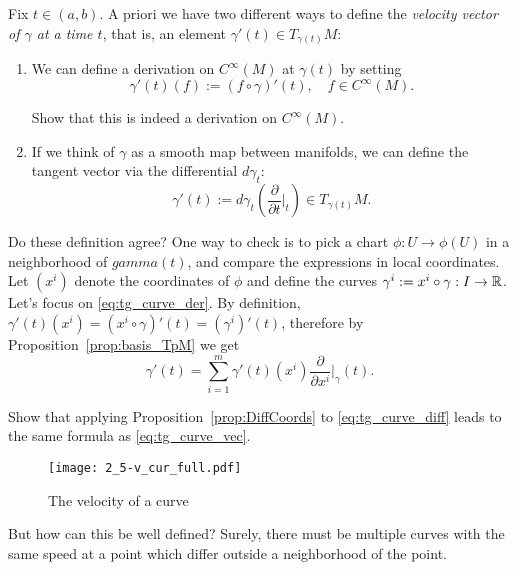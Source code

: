 Fix $t\in(a,b)$. 
A priori we have two different ways to define the \emph{velocity vector of $\gamma$ at a time $t$}, that is, an element $\gamma'(t) \in T_{\gamma(t)}M$:
\begin{enumerate}
    \item We can define a derivation on $C^\infty(M)$ at $\gamma(t)$ by setting
    \begin{equation}\label{eq:tg_curve_der}
        \gamma'(t) (f) := (f\circ\gamma)'(t), \quad f\in C^\infty(M).
    \end{equation}
    \begin{exe}
        Show that this is indeed a derivation on $C^\infty(M)$.
    \end{exe}
    \item If we think of $\gamma$ as a smooth map between manifolds, we can define the tangent vector via the differential $d\gamma_t$:
    \begin{equation}\label{eq:tg_curve_diff}
        \gamma'(t):= d\gamma_t\left(\frac{\partial}{\partial t}\Big|_t\right) \in T_{\gamma(t)}M.
    \end{equation}
\end{enumerate}

Do these definition agree?
One way to check is to pick a chart $\phi: U \to \phi(U)$ in a neighborhood of $gamma(t)$, and compare the expressions in local coordinates. Let $(x^i)$ denote the coordinates of $\phi$ and define the curves $\gamma^i := x^i \circ \gamma : I\to\mathbb{R}$.
Let's focus on \eqref{eq:tg_curve_der}. By definition, $\gamma'(t)(x^i) = (x^i\circ\gamma)'(t) = (\gamma^i)'(t)$, therefore by Proposition~\ref{prop:basis_TpM} we get
\begin{equation}\label{eq:tg_curve_vec}
    \gamma'(t) = \sum_{i=1}^m \gamma'(t)(x^i) \frac{\partial}{\partial x^i}\Big|_\gamma(t).
\end{equation}
\begin{exe}
    Show that applying Proposition~\ref{prop:DiffCoords} to \eqref{eq:tg_curve_diff} leads to the same formula as \eqref{eq:tg_curve_vec}.
\end{exe}

\begin{figure*}[htp]
    \centering
    \texttt{[image: 2\_5-v\_cur\_full.pdf]}
    \caption{The velocity of a curve}
    \label{fig:2_5-v_cur_full}
\end{figure*}

But how can this be well defined? Surely, there must be multiple curves with the same speed at a point which differ outside a neighborhood of the point.

